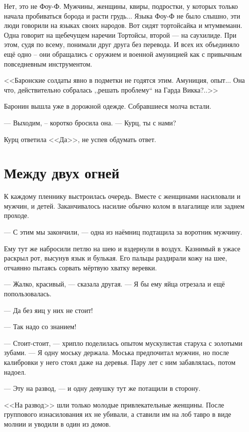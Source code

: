 Нет, это не Фоу-Ф.
Мужчины, женщины, квиры, подростки, у которых только начала пробиваться борода и расти грудь...
Языка Фоу-Ф не было слышно, эти люди говорили на языках своих народов.
Вот сидят тортойсайка и мтумвеманн.
Одна говорит на щебечущем наречии Тортойсы, второй --- на саухилиде.
При этом, судя по всему, понимали друг друга без перевода.
И всех их объединяло ещё одно -- они обращались с оружием и военной амуницией как с привычным повседневным инструментом.

<<Баронские солдаты явно в подметки не годятся этим.
Амуниция, опыт...
Она что, действительно собралась ,,решать проблему`` на Гарда Викка?..>>

Баронин вышла уже в дорожной одежде.
Собравшиеся молча встали.

--- Выходим, -- коротко бросила она.
--- Курц, ты с нами?

Курц ответила <<Да>>, не успев обдумать ответ.

\section{Между двух огней}

К каждому пленнику выстроилась очередь.
Вместе с женщинами насиловали и мужчин, и детей.
Заканчивалось насилие обычно колом в влагалище или заднем проходе.

--- С этим мы закончили, --- одна из наёмниц подтащила за воротник мужчину.

Ему тут же набросили петлю на шею и вздернули в воздух.
Казнимый в ужасе раскрыл рот, высунув язык и булькая.
Его пальцы раздирали кожу на шее, отчаянно пытаясь сорвать мёртвую хватку веревки.

--- Жалко, красивый, --- сказала другая.
--- Я бы ему яйца отрезала и ещё попользовалась.

--- Да без яиц у них не стоит!

--- Так надо со знанием!

--- Стоит-стоит, --- хрипло поделилась опытом мускулистая старуха с золотыми зубами.
--- Я одну моську держала.
Моська предпочитал мужчин, но после калибровки у него стоял даже на деревья.
Пару лет с ним забавлялась, потом надоел.

--- Эту на развод, --- и одну девушку тут же потащили в сторону.

<<На развод>> шли только молодые привлекательные женщины.
После группового изнасилования их не убивали, а ставили им на лоб тавро в виде молнии и уводили в один из домов.

